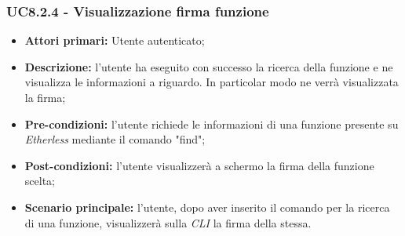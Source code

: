 \subsubsection{UC8.2.4 - Visualizzazione firma funzione}
\begin{itemize}
	\item \textbf{Attori primari:} Utente autenticato;
	\item \textbf{Descrizione:} l'utente ha eseguito con successo la ricerca della funzione e ne visualizza le informazioni a riguardo. In particolar modo ne verrà visualizzata la firma; 
	\item \textbf{Pre-condizioni:} l'utente richiede le informazioni di una funzione presente su \textit{Etherless} mediante il comando "find"; 
	\item \textbf{Post-condizioni:} l'utente visualizzerà a schermo la firma della funzione scelta;
	\item \textbf{Scenario principale:} l'utente, dopo aver inserito il comando per la ricerca di una funzione, visualizzerà sulla \textit{CLI\glo} la firma della stessa.
\end{itemize}